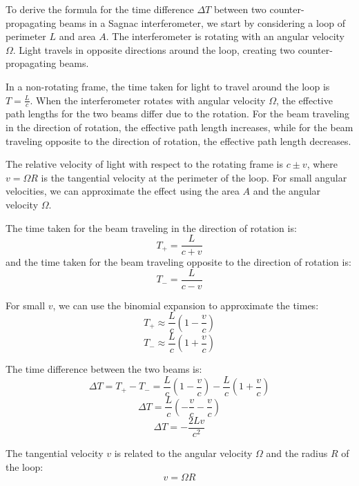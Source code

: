 \documentclass[
  a4paper,
]{book}
\begin{document}
\begin{tcolorbox}[enhanced jigsaw, coltitle=black, title=\textcolor{quarto-callout-note-color}{\faInfo}\hspace{0.5em}{Derivation Details}, colframe=quarto-callout-note-color-frame, toprule=.15mm, opacitybacktitle=0.6, left=2mm, opacityback=0, breakable, toptitle=1mm, bottomtitle=1mm, leftrule=.75mm, arc=.35mm, titlerule=0mm, colbacktitle=quarto-callout-note-color!10!white, rightrule=.15mm, bottomrule=.15mm, colback=white]

To derive the formula for the time difference \(\Delta T\) between two
counter-propagating beams in a Sagnac interferometer, we start by
considering a loop of perimeter \(L\) and area \(A\). The interferometer
is rotating with an angular velocity \(\Omega\). Light travels in
opposite directions around the loop, creating two counter-propagating
beams.

In a non-rotating frame, the time taken for light to travel around the
loop is \(T = \frac{L}{c}\). When the interferometer rotates with
angular velocity \(\Omega\), the effective path lengths for the two
beams differ due to the rotation. For the beam traveling in the
direction of rotation, the effective path length increases, while for
the beam traveling opposite to the direction of rotation, the effective
path length decreases.

The relative velocity of light with respect to the rotating frame is
\(c \pm v\), where \(v = \Omega R\) is the tangential velocity at the
perimeter of the loop. For small angular velocities, we can approximate
the effect using the area \(A\) and the angular velocity \(\Omega\).

The time taken for the beam traveling in the direction of rotation is:
\[
T_+ = \frac{L}{c + v}
\] and the time taken for the beam traveling opposite to the direction
of rotation is: \[
T_- = \frac{L}{c - v}
\]

For small \(v\), we can use the binomial expansion to approximate the
times: \[
T_+ \approx \frac{L}{c} \left(1 - \frac{v}{c}\right)
\] \[
T_- \approx \frac{L}{c} \left(1 + \frac{v}{c}\right)
\]

The time difference between the two beams is: \[
\Delta T = T_+ - T_- = \frac{L}{c} \left(1 - \frac{v}{c}\right) - \frac{L}{c} \left(1 + \frac{v}{c}\right)
\] \[
\Delta T = \frac{L}{c} \left(- \frac{v}{c} - \frac{v}{c}\right)
\] \[
\Delta T = -\frac{2Lv}{c^2}
\]

The tangential velocity \(v\) is related to the angular velocity
\(\Omega\) and the radius \(R\) of the loop: \[
v = \Omega R
\]


\end{tcolorbox}
\end{document}
